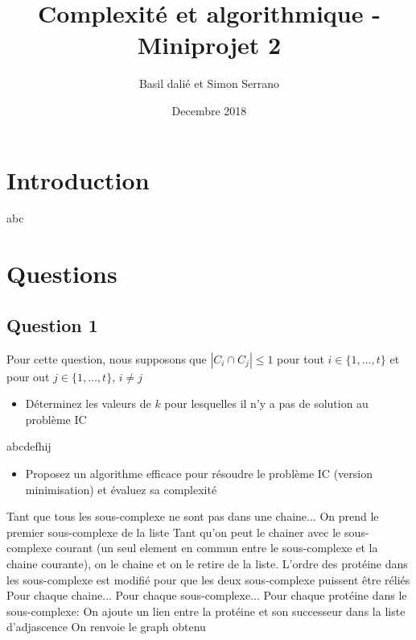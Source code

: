 \documentclass{report}
\title{Complexité et algorithmique - Miniprojet 2}
\author{Basil dalié et Simon Serrano}
\date{Decembre 2018}
\begin{document}
\maketitle

\chapter{Introduction}
abc

\chapter{Questions}
\section{Question 1}
Pour cette question, nous supposons que $|C_i \cap C_j| \leq 1$ pour tout $i \in \{1, ..., t\}$ et pour out $j \in \{1, ..., t\}$, $i \neq j$
\begin{itemize}
\item Déterminez les valeurs de $k$ pour lesquelles il n'y a pas de solution au problème IC
\end{itemize}
abcdefhij

\begin{itemize}
\item Proposez un algorithme efficace pour résoudre le problème IC (version minimisation) et évaluez sa complexité
\end{itemize}
\begin{algorithm}[H]
  Tant que tous les sous-complexe ne sont pas dans une chaine...
    On prend le premier sous-complexe de la liste
    Tant qu'on peut le chainer avec le sous-complexe courant (un seul element en commun entre le sous-complexe et la chaine courante), on le chaine et on le retire de la liste.
    L'ordre des protéine dans les sous-complexe est modifié pour que les deux sous-complexe puissent être réliés
  Pour chaque chaine...
    Pour chaque sous-complexe...
      Pour chaque protéine dans le sous-complexe:
        On ajoute un lien entre la protéine et son successeur dans la liste d'adjascence
  On renvoie le graph obtenu
\end{algorithm}
\end{document}
